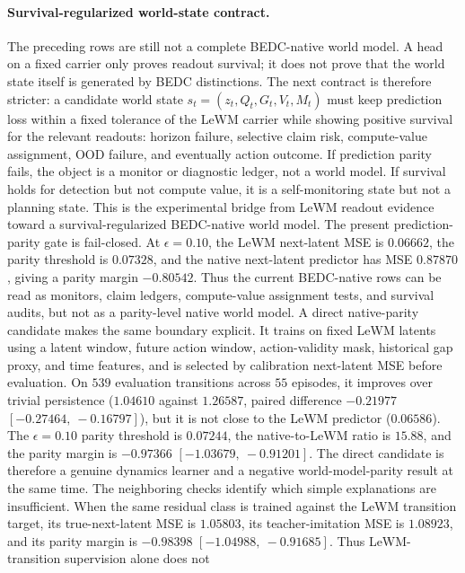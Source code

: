 \paragraph{Survival-regularized world-state contract.}
The preceding rows are still not a complete BEDC-native world model.  A head
on a fixed carrier only proves readout survival; it does not prove that the
world state itself is generated by BEDC distinctions.  The next contract is
therefore stricter: a candidate world state $s_t=(z_t,Q_t,G_t,V_t,M_t)$ must
keep prediction loss within a fixed tolerance of the LeWM carrier while
showing positive survival for the relevant readouts: horizon failure,
selective claim risk, compute-value assignment, OOD failure, and eventually
action outcome.  If prediction parity fails, the object is a monitor or
diagnostic ledger, not a world model.  If survival holds for detection but not
compute value, it is a self-monitoring state but not a planning state.  This
is the experimental bridge from LeWM readout evidence toward a
survival-regularized BEDC-native world model.
The present prediction-parity gate is fail-closed.  At $\epsilon=0.10$, the
LeWM next-latent MSE is $0.06662$, the parity threshold is $0.07328$, and the
native next-latent predictor has MSE $0.87870$, giving a parity margin
$-0.80542$.  Thus the current BEDC-native rows can be read as monitors,
claim ledgers, compute-value assignment tests, and survival audits, but not as
a parity-level native world model.
A direct native-parity candidate makes the same boundary explicit.  It trains
on fixed LeWM latents using a latent window, future action window,
action-validity mask, historical gap proxy, and time features, and is selected
by calibration next-latent MSE before evaluation.  On $539$ evaluation
transitions across $55$ episodes, it improves over trivial persistence
($1.04610$ against $1.26587$, paired difference $-0.21977$
$[-0.27464,\ -0.16797]$), but it is not close to the LeWM predictor
($0.06586$).  The $\epsilon=0.10$ parity threshold is $0.07244$, the
native-to-LeWM ratio is $15.88$, and the parity margin is $-0.97366$
$[-1.03679,\ -0.91201]$.  The direct candidate is therefore a genuine
dynamics learner and a negative world-model-parity result at the same time.
The neighboring checks identify which simple explanations are insufficient.
When the same residual class is trained against the LeWM transition target,
its true-next-latent MSE is $1.05803$, its teacher-imitation MSE is
$1.08923$, and its parity margin is $-0.98398$
$[-1.04988,\ -0.91685]$.  Thus LeWM-transition supervision alone does not
